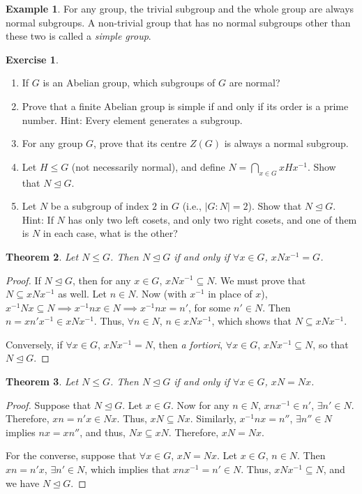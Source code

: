 \documentclass[svgnames]{article}
\newtheorem{Theorem}{Theorem}[section]
\theoremstyle{definition}
\newtheorem{Example}[Theorem]{Example}
\newtheorem{Exercise}{Exercise}[section]
\theoremstyle{remark}
\begin{document}
\begin{Example}
For any group, the trivial subgroup and the whole group are always normal subgroups. A non-trivial group that has no normal subgroups other than these two is called a \emph{simple group}.
\end{Example}

\begin{Exercise}
\begin{enumerate}
\item If $G$ is an Abelian group, which subgroups of $G$ are normal?
\item Prove that a finite Abelian group is simple if and only if its order is a prime number. {\tiny Hint: Every element generates a subgroup.}
\item For any group $G$, prove that its centre $Z(G)$ is always a normal subgroup.
\item Let $H \le G$ (not necessarily normal), and define $N = \bigcap\limits_{x \in G} xHx^{-1}$. Show that $N \unlhd G$.
\item Let $N$ be a subgroup of index $2$ in $G$ (i.e., $|G : N| = 2$). Show that $N \unlhd G$. {\tiny Hint: If $N$ has only two left cosets, and only two right cosets, and one of them is $N$ in each case, what is the other?}
\end{enumerate}
\end{Exercise}

\begin{Theorem}
Let $N \le G$. Then $N \unlhd G$ if and only if $\forall x \in G$, $xNx^{-1} = G$.
\end{Theorem}
\begin{proof}
If $N \unlhd G$, then for any $x \in G$, $xNx^{-1} \subseteq N$. We must prove that $N \subseteq xNx^{-1}$ as well. Let $n \in N$. Now (with $x^{-1}$ in place of $x$), $x^{-1}Nx \subseteq N \implies x^{-1}nx \in N \implies x^{-1}nx = n'$, for some $n' \in N$. Then $n = xn'x^{-1} \in xNx^{-1}$. Thus, $\forall n \in N$, $n \in xNx^{-1}$, which shows that $N \subseteq xNx^{-1}$.

Conversely, if $\forall x \in G$, $xNx^{-1} = N$, then \emph{a fortiori}, $\forall x \in G$, $xNx^{-1} \subseteq N$, so that $N \unlhd G$.
\end{proof}

\begin{Theorem}
Let $N \le G$. Then $N \unlhd G$ if and only if $\forall x \in G$, $xN = Nx$.
\end{Theorem}
\begin{proof}
Suppose that $N \unlhd G$. Let $x \in G$. Now for any $n \in N$, $xnx^{-1} \in n'$, $\exists n' \in N$. Therefore, $xn = n'x \in Nx$. Thus, $xN \subseteq Nx$. Similarly, $x^{-1}nx = n''$, $\exists n'' \in N$ implies $nx = xn''$, and thus, $Nx \subseteq xN$. Therefore, $xN = Nx$.

For the converse, suppose that $\forall x \in G$, $xN = Nx$. Let $x \in G$, $n \in N$. Then $xn = n'x$, $\exists n' \in N$, which implies that $xnx^{-1} = n' \in N$. Thus, $xNx^{-1} \subseteq N$, and we have $N \unlhd G$.
\end{proof}
\end{document}
